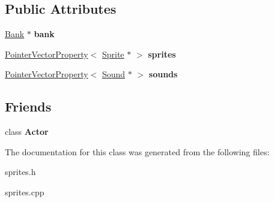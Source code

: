\subsection*{Public Attributes}
\begin{DoxyCompactItemize}
\item 
\hypertarget{classg2c_1_1_world_ae0214f6de363ec9a97c3ce5f3327f60e}{
\hyperlink{classg2c_1_1_bank}{Bank} $\ast$ {\bfseries bank}}
\label{classg2c_1_1_world_ae0214f6de363ec9a97c3ce5f3327f60e}

\item 
\hypertarget{classg2c_1_1_world_ab6a0f0e192b314634dc27bcfdff5bd17}{
\hyperlink{classg2c_1_1_pointer_vector_property}{PointerVectorProperty}$<$ \hyperlink{classg2c_1_1_sprite}{Sprite} $\ast$ $>$ {\bfseries sprites}}
\label{classg2c_1_1_world_ab6a0f0e192b314634dc27bcfdff5bd17}

\item 
\hypertarget{classg2c_1_1_world_ad163b3312a82df4ebe8eed50b0dbedc3}{
\hyperlink{classg2c_1_1_pointer_vector_property}{PointerVectorProperty}$<$ \hyperlink{classg2c_1_1_sound}{Sound} $\ast$ $>$ {\bfseries sounds}}
\label{classg2c_1_1_world_ad163b3312a82df4ebe8eed50b0dbedc3}

\end{DoxyCompactItemize}
\subsection*{Friends}
\begin{DoxyCompactItemize}
\item 
\hypertarget{classg2c_1_1_world_ae4af50bf1743d112cb2c2c784bea21c8}{
class {\bfseries Actor}}
\label{classg2c_1_1_world_ae4af50bf1743d112cb2c2c784bea21c8}

\end{DoxyCompactItemize}


The documentation for this class was generated from the following files:\begin{DoxyCompactItemize}
\item 
sprites.h\item 
sprites.cpp\end{DoxyCompactItemize}
